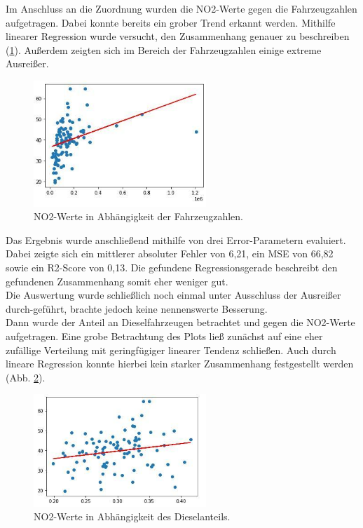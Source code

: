 \documentclass[11pt,a4paper,oneside,german]{article}
\begin{document}
	Im Anschluss an die Zuordnung wurden die NO2-Werte gegen die Fahrzeugzahlen aufgetragen. Dabei konnte bereits ein grober Trend erkannt werden. Mithilfe linearer Regression wurde versucht, den Zusammenhang genauer zu beschreiben (\ref{fig:linreginsgesamt}). Außerdem zeigten sich im Bereich der Fahrzeugzahlen einige extreme Ausreißer.
	
	\begin{figure}[h!]
		\centering
		\includegraphics[width=6.5cm]{linreginsgesamt.jpg}
		\caption{NO2-Werte in Abhängigkeit der Fahrzeugzahlen.}
		\label{fig:linreginsgesamt}
	\end{figure}
	
	Das Ergebnis wurde anschließend mithilfe von drei Error-Parametern evaluiert. Dabei zeigte sich ein mittlerer absoluter Fehler von 6,21, ein MSE von 66,82 sowie ein R2-Score von 0,13. Die gefundene Regressionsgerade beschreibt den gefundenen Zusammenhang somit eher weniger gut. \\
	Die Auswertung wurde schließlich noch einmal unter Ausschluss der Ausreißer durch-geführt, brachte jedoch keine nennenswerte Besserung. \\
	Dann wurde der Anteil an Dieselfahrzeugen betrachtet und gegen die NO2-Werte aufgetragen. Eine grobe Betrachtung des Plots ließ zunächst auf eine eher zufällige Verteilung mit geringfügiger linearer Tendenz schließen. Auch durch lineare Regression konnte hierbei kein starker Zusammenhang festgestellt werden (Abb. \ref{fig:linregdieselanteil}).
	
	\begin{figure}[H]
		\centering
		\includegraphics[width=6.5cm]{linregdieselanteil.jpg}
		\caption{NO2-Werte in Abhängigkeit des Dieselanteils.}
		\label{fig:linregdieselanteil}
	\end{figure}
	
\end{document}
